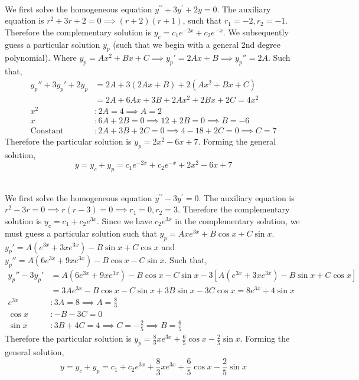 \documentclass{article}
\begin{document}
\sol \\
We first solve the homogeneous equation $y^{\prime \prime}+3 y^{\prime}+2 y=0$.
The auxiliary equation is $r^2 + 3r +2 = 0 \implies (r+2)(r+1)$, such that $r_1 = -2, r_2 = -1$.
Therefore the complementary solution is $y_c = c_1 e^{-2x} + c_2 e^{-x}$.
\double
We subsequently guess a particular solution $y_p$ (such that we begin with a general 2nd degree polynomial).
Where $y_p = Ax^2 + Bx + C \implies y_p' = 2Ax + B \implies y_p'' = 2A$.
Such that,
\begin{align*}
y_p'' + 3y_p' + 2y_p &= 2A + 3(2Ax + B) + 2(Ax^2 + Bx + C) \\
&= 2A + 6Ax + 3B + 2Ax^2 + 2Bx + 2C = 4x^2 \\
x^2 &: 2A = 4 \implies A = 2 \\
x &: 6A + 2B = 0 \implies 12 + 2B = 0 \implies B = -6 \\
\text{Constant} &: 2A + 3B +2C = 0 \implies 4 -18 + 2C = 0 \implies C = 7
\end{align*}
Therefore the particular solution is $y_p = 2x^2 - 6x + 7$.
Forming the general solution,
$$\boxed{y = y_c + y_p = c_1 e^{-2x} + c_2 e^{-x} + 2x^2 - 6x + 7}$$

\sol \\
We first solve the homogeneous equation $y^{\prime \prime}-3 y^{\prime}=0$.
The auxiliary equation is $r^2 - 3r = 0 \implies r(r-3) = 0 \implies r_1 = 0, r_2 = 3$.
Therefore the complementary solution is $y_c = c_1 + c_2 e^{3x}$.
\double
Since we have $c_2 e^{3x}$ in the complementary solution,
we must guess a particular solution such that $y_p = Axe^{3x} + B \cos x + C \sin x$.
$y_p' = A(e^{3x} + 3x e^{3x}) - B \sin x + C \cos x$ and $y_p'' = A(6e^{3x} + 9x e^{3x}) - B \cos x - C \sin x$.
Such that,
\begin{align*}
  y_p'' - 3y_p' &= A(6e^{3x} + 9x e^{3x}) - B \cos x - C \sin x - 3[A(e^{3x} + 3x e^{3x}) - B \sin x + C \cos x] \\
  &= 3A e^{3x} - B \cos x - C \sin x + 3B \sin x - 3C \cos x = 8e^{3x} + 4 \sin x \\
  e^{3x} &: 3A = 8 \implies A = \frac{8}{3} \\
  \cos x &: -B -3C = 0 \\
  \sin x &: 3B + 4C = 4 \implies C = -\frac{2}{5} \implies B = \frac{6}{5}
\end{align*}
Therefore the particular solution is $y_p = \frac{8}{3}xe^{3x} + \frac{6}{5} \cos x - \frac{2}{5} \sin x$.
Forming the general solution,
$$\boxed{y = y_c + y_p = c_1 + c_2 e^{3x} + \frac{8}{3}xe^{3x} + \frac{6}{5} \cos x - \frac{2}{5} \sin x}$$
\end{document}
